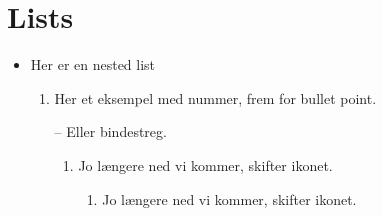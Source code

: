 \section{Lists}

\begin{itemize}
    \item Her er en nested list
    \begin{enumerate}
        \item Her et eksempel med nummer, frem for bullet point.
        \item[--] Eller bindestreg.
        \begin{enumerate}
            \item Jo længere ned vi kommer, skifter ikonet.
            \begin{enumerate}
                \item Jo længere ned vi kommer, skifter ikonet.
            \end{enumerate}
        \end{enumerate}  
    \end{enumerate}
\end{itemize}